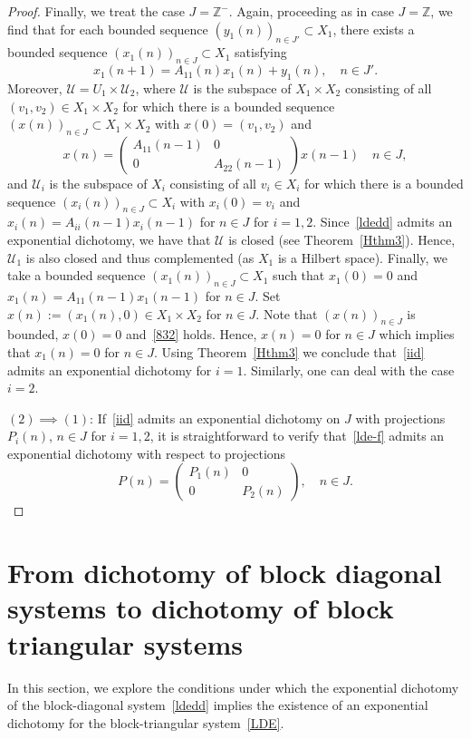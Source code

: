 \documentclass[11pt,reqno,a4paper]{amsart}
\theoremstyle{plain}
\numberwithin{equation}{section}
\theoremstyle{remark}
\begin{document}
\begin{proof}
Finally, we treat the case $J=\mathbb Z^-$. Again, proceeding as in case $J=\mathbb Z$, we find that for each bounded sequence $(y_1(n))_{n\in J'}\subset X_1$, there exists a bounded sequence $(x_1(n))_{n\in J}\subset X_1$ satisfying
\[
x_1(n+1)=A_{11}(n)x_1(n)+y_1(n), \quad n\in J'.
\]
Moreover, $\mathcal U=U_1\times \mathcal U_2$, where $\mathcal U$ is the subspace of $X_1\times X_2$ consisting of all $(v_1, v_2)\in X_1\times X_2$ for which there is a bounded sequence $(x(n))_{n\in J}\subset X_1\times X_2$ with $x(0)=(v_1, v_2)$ and 
\begin{equation}\label{832}
x(n)=\begin{pmatrix}
A_{11}(n-1) & 0\\
0 & A_{22}(n-1)
\end{pmatrix}x(n-1) \quad n\in J,
\end{equation} and  $\mathcal U_i$ is the subspace of $X_i$ consisting of all $v_i \in X_i$ for which there is a bounded sequence $(x_i(n))_{n\in J}\subset X_i$ with $x_i(0)=v_i$ and $x_i(n)=A_{ii}(n-1)x_i(n-1)$ for $n\in J$ for $i=1, 2$. Since~\eqref{ldedd} admits an exponential dichotomy, we have that $\mathcal U$ is closed (see Theorem~\ref{Hthm3}). 
Hence, $\mathcal U_1$ is also closed and thus complemented (as $X_1$ is a Hilbert space). Finally, we take  a bounded sequence $(x_1(n))_{n\in J}\subset X_1$ such that $x_1(0)=0$ and $x_1(n)=A_{11}(n-1)x_1(n-1)$ for $n\in J$. Set $x(n):=(x_1(n), 0)\in X_1\times X_2$ for $n\in J$. Note that $(x(n))_{n\in J}$ is bounded, $x(0)=0$ and~\eqref{832} holds. Hence, $x(n)=0$ for $n\in J$ which implies that $x_1(n)=0$ for $n\in J$.
Using Theorem~\ref{Hthm3} we conclude that~\eqref{iid} admits an exponential dichotomy for $i=1$. Similarly, one can deal with the case $i=2$.

$(2)\implies (1)$: If~\eqref{iid} admits an exponential dichotomy on $J$ with projections $P_i(n)$, $n\in J$ for $i=1, 2$, it is straightforward to verify that~\eqref{lde-f} admits an exponential dichotomy with respect to projections 
\[
P(n)=\begin{pmatrix}
P_1(n) & 0\\
0 &P_2(n)
\end{pmatrix}, \quad n\in J.
\]


\end{proof}

\medskip

\section{From  dichotomy of block diagonal systems to dichotomy of block triangular systems}\label{Results1}
In this section, we explore the conditions under which the exponential dichotomy of the block-diagonal system~\eqref{ldedd} implies the existence of an exponential dichotomy for the block-triangular system~\eqref{LDE}. 
\end{document}

